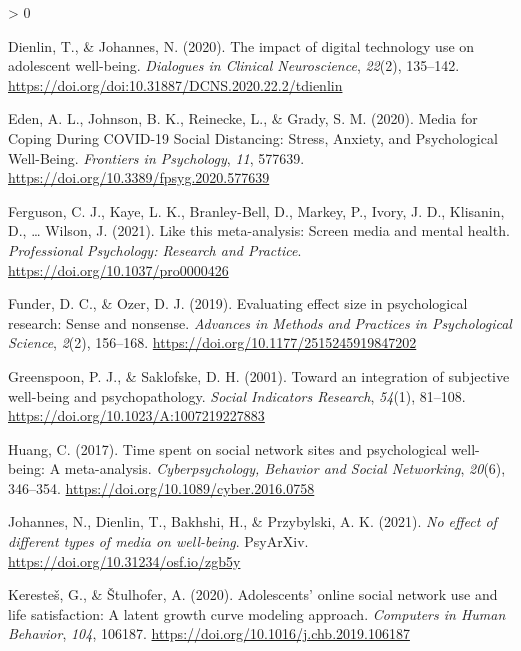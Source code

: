 \documentclass[
  english,
  man,mask,floatsintext]{apa6}
\newlength{\cslhangindent}
\newenvironment{CSLReferences}[2] %
 {%
  \setlength{\parindent}{0pt}
  \ifodd #1 \everypar{\setlength{\hangindent}{\cslhangindent}}\ignorespaces\fi
  \ifnum #2 > 0
  \setlength{\parskip}{#2\baselineskip}
  \fi
 }%
 {}
\begin{document}
\begin{CSLReferences}{1}{0}
\leavevmode\hypertarget{ref-dienlinImpactDigitalTechnology2020}{}%
Dienlin, T., \& Johannes, N. (2020). The impact of digital technology use on adolescent well-being. \emph{Dialogues in Clinical Neuroscience}, \emph{22}(2), 135--142. \url{https://doi.org/doi:10.31887/DCNS.2020.22.2/tdienlin}

\leavevmode\hypertarget{ref-edenMediaCopingCOVID192020}{}%
Eden, A. L., Johnson, B. K., Reinecke, L., \& Grady, S. M. (2020). Media for {Coping} {During} {COVID}-19 {Social} {Distancing}: {Stress}, {Anxiety}, and {Psychological} {Well}-{Being}. \emph{Frontiers in Psychology}, \emph{11}, 577639. \url{https://doi.org/10.3389/fpsyg.2020.577639}

\leavevmode\hypertarget{ref-fergusonThisMetaanalysisScreen2021}{}%
Ferguson, C. J., Kaye, L. K., Branley-Bell, D., Markey, P., Ivory, J. D., Klisanin, D., \ldots{} Wilson, J. (2021). Like this meta-analysis: {Screen} media and mental health. \emph{Professional Psychology: Research and Practice}. \url{https://doi.org/10.1037/pro0000426}

\leavevmode\hypertarget{ref-funderEvaluatingEffectSize2019}{}%
Funder, D. C., \& Ozer, D. J. (2019). Evaluating effect size in psychological research: {Sense} and nonsense. \emph{Advances in Methods and Practices in Psychological Science}, \emph{2}(2), 156--168. \url{https://doi.org/10.1177/2515245919847202}

\leavevmode\hypertarget{ref-greenspoonIntegrationSubjectiveWellbeing2001}{}%
Greenspoon, P. J., \& Saklofske, D. H. (2001). Toward an integration of subjective well-being and psychopathology. \emph{Social Indicators Research}, \emph{54}(1), 81--108. \url{https://doi.org/10.1023/A:1007219227883}

\leavevmode\hypertarget{ref-huangTimeSpentSocial2017}{}%
Huang, C. (2017). Time spent on social network sites and psychological well-being: {A} meta-analysis. \emph{Cyberpsychology, Behavior and Social Networking}, \emph{20}(6), 346--354. \url{https://doi.org/10.1089/cyber.2016.0758}

\leavevmode\hypertarget{ref-johannesNoEffectDifferent2021}{}%
Johannes, N., Dienlin, T., Bakhshi, H., \& Przybylski, A. K. (2021). \emph{No effect of different types of media on well-being}. PsyArXiv. \url{https://doi.org/10.31234/osf.io/zgb5y}

\leavevmode\hypertarget{ref-kerestesAdolescentsOnlineSocial2020}{}%
Keresteš, G., \& Štulhofer, A. (2020). Adolescents' online social network use and life satisfaction: {A} latent growth curve modeling approach. \emph{Computers in Human Behavior}, \emph{104}, 106187. \url{https://doi.org/10.1016/j.chb.2019.106187}


\end{CSLReferences}
\end{document}
